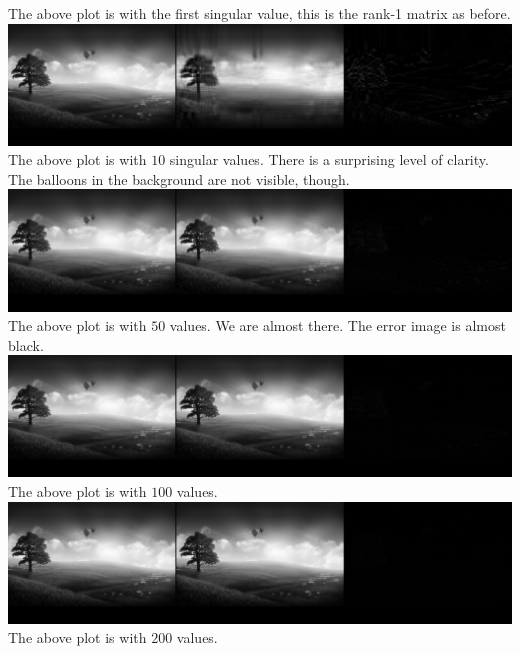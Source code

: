 \documentclass{article}
\begin{document}
The above plot is with the first singular value, this is the rank-1 matrix as before.\\

\includegraphics[width =\textwidth]{SVD/a/Rect/False/recon0010.png}\\

The above plot is with $10$ singular values. There is a surprising level of clarity. The balloons in the background are not visible, though.\\

\includegraphics[width =\textwidth]{SVD/a/Rect/False/recon0050.png}\\
The above plot is with $50$ values. We are almost there. The error image is almost black.\\

\includegraphics[width =\textwidth]{SVD/a/Rect/False/recon0100.png}\\
The above plot is with $100$ values.\\


\includegraphics[width =\textwidth]{SVD/a/Rect/False/recon0200.png}\\
The above plot is with $200$ values.\\
\end{document}
